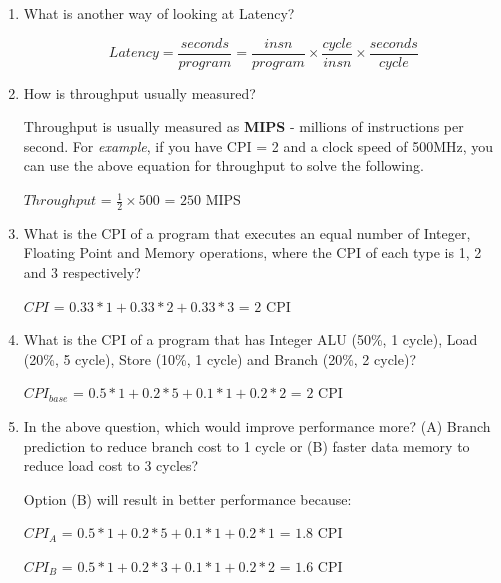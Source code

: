 \documentclass[12pt]{article}
\newenvironment{QandA}{\begin{enumerate}[label=\bfseries\arabic*.]\bfseries}
                      {\end{enumerate}}
\newenvironment{answered}{\par\quad\normalfont}{}
\begin{document}
\begin{QandA}
    \item What is another way of looking at Latency?
        \begin{answered}
        \begin{equation}
            Latency = \frac{seconds}{program} = \frac{insn}{program} \times \frac{cycle}{insn} \times \frac{seconds}{cycle}
        \end{equation}
        \end{answered}

    \item How is throughput usually measured?
        \begin{answered}
        Throughput is usually measured as \textbf{MIPS} - millions of instructions per second. For \textit{example}, if you have CPI = 2 and a clock speed of 500MHz, you can use the above equation for throughput to solve the following.
        
        $Throughput$ = $\frac{1}{2} \times 500$ = $250$ MIPS
        \end{answered}
        
    \item What is the CPI of a program that executes an equal number of Integer, Floating Point and Memory operations, where the CPI of each type is 1, 2 and 3 respectively?
        \begin{answered}
        $CPI$ = $0.33*1+0.33*2+0.33*3$ = $2$ CPI
        \end{answered}
        
    \item What is the CPI of a program that has Integer ALU (50\%, 1 cycle), Load (20\%, 5 cycle), Store (10\%, 1 cycle) and Branch (20\%, 2 cycle)?
        \begin{answered}
        $CPI_{base}$ = $0.5*1+0.2*5+0.1*1+0.2*2$ = $2$ CPI 
        \end{answered}
        
    \item In the above question, which would improve performance more? (A) Branch prediction to reduce branch cost to 1 cycle or (B) faster data memory to reduce load cost to 3 cycles?
        \begin{answered}
        Option (B) will result in better performance because:
        
        $CPI_{A}$ = $0.5*1+0.2*5+0.1*1+0.2*1$ = $1.8$ CPI
        
        $CPI_{B}$ = $0.5*1+0.2*3+0.1*1+0.2*2$ = $1.6$ CPI
        \end{answered}
        

\end{QandA}
\end{document}
